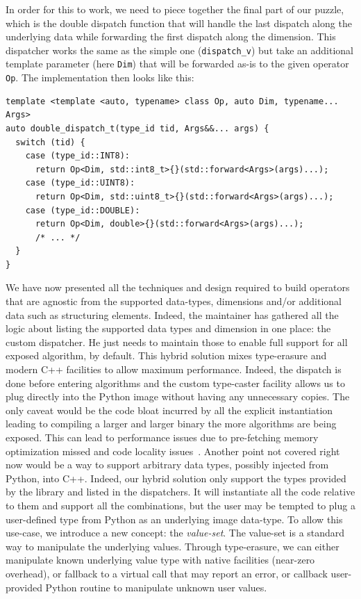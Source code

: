 In order for this to work, we need to piece together the final part of our puzzle, which is the double dispatch function
that will handle the last dispatch along the underlying data while forwarding the first dispatch along the dimension.
This dispatcher works the same as the simple one (\texttt{dispatch\_v}) but take an additional template parameter (here
\texttt{Dim}) that will be forwarded as-is to the given operator \texttt{Op}. The implementation then looks like this:
\begin{verbatim}
template <template <auto, typename> class Op, auto Dim, typename... Args>
auto double_dispatch_t(type_id tid, Args&&... args) {
  switch (tid) {
    case (type_id::INT8):
      return Op<Dim, std::int8_t>{}(std::forward<Args>(args)...);
    case (type_id::UINT8):
      return Op<Dim, std::uint8_t>{}(std::forward<Args>(args)...);
    case (type_id::DOUBLE):
      return Op<Dim, double>{}(std::forward<Args>(args)...);
      /* ... */
  }
}
\end{verbatim}
We have now presented all the techniques and design required to build operators that are agnostic from the supported
data-types, dimensions and/or additional data such as structuring elements. Indeed, the maintainer has gathered all the
logic about listing the supported data types and dimension in one place: the custom dispatcher. He just needs to
maintain those to enable full support for all exposed algorithm, by default. This hybrid solution mixes type-erasure and
modern C++ facilities to allow maximum performance. Indeed, the dispatch is done before entering algorithms and the
custom type-caster facility allows us to plug directly into the Python image without having any unnecessary copies. The
only caveat would be the code bloat incurred by all the explicit instantiation leading to compiling a larger and larger
binary the more algorithms are being exposed. This can lead to performance issues due to pre-fetching memory
optimization missed and code locality issues~\parencite{badawy.2001.locality}. Another point not covered right now would
be a way to support arbitrary data types, possibly injected from Python, into C++. Indeed, our hybrid solution only
support the types provided by the library and listed in the dispatchers. It will instantiate all the code relative to
them and support all the combinations, but the user may be tempted to plug a user-defined type from Python as an
underlying image data-type. To allow this use-case, we introduce a new concept: the \emph{value-set}. The value-set is a
standard way to manipulate the underlying values. Through type-erasure, we can either manipulate known underlying value
type with native facilities (near-zero overhead), or fallback to a virtual call that may report an error, or callback
user-provided Python routine to manipulate unknown user values.


